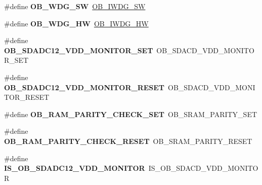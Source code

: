 \begin{DoxyCompactItemize}
\#define {\bfseries O\+B\+\_\+\+W\+D\+G\+\_\+\+SW}~\mbox{\hyperlink{group___f_l_a_s_h_ex___option___bytes___i_watchdog_ga5a357e232c955444c3f2ccb9a937ffce}{O\+B\+\_\+\+I\+W\+D\+G\+\_\+\+SW}}
\item 
\mbox{\label{group___h_a_l___f_l_a_s_h___aliased___defines_gae9a94b5f21aaa5dd5558095fa684b5a3}} 
\#define {\bfseries O\+B\+\_\+\+W\+D\+G\+\_\+\+HW}~\mbox{\hyperlink{group___f_l_a_s_h_ex___option___bytes___i_watchdog_gadfcbfa963d79c339ec8e2d5a7734e47a}{O\+B\+\_\+\+I\+W\+D\+G\+\_\+\+HW}}
\item 
\mbox{\label{group___h_a_l___f_l_a_s_h___aliased___defines_ga28d03f0c0e87570a3bc2faa4e720b8e3}} 
\#define {\bfseries O\+B\+\_\+\+S\+D\+A\+D\+C12\+\_\+\+V\+D\+D\+\_\+\+M\+O\+N\+I\+T\+O\+R\+\_\+\+S\+ET}~O\+B\+\_\+\+S\+D\+A\+C\+D\+\_\+\+V\+D\+D\+\_\+\+M\+O\+N\+I\+T\+O\+R\+\_\+\+S\+ET
\item 
\mbox{\label{group___h_a_l___f_l_a_s_h___aliased___defines_ga330d35b134c5a576318103b718559b11}} 
\#define {\bfseries O\+B\+\_\+\+S\+D\+A\+D\+C12\+\_\+\+V\+D\+D\+\_\+\+M\+O\+N\+I\+T\+O\+R\+\_\+\+R\+E\+S\+ET}~O\+B\+\_\+\+S\+D\+A\+C\+D\+\_\+\+V\+D\+D\+\_\+\+M\+O\+N\+I\+T\+O\+R\+\_\+\+R\+E\+S\+ET
\item 
\mbox{\label{group___h_a_l___f_l_a_s_h___aliased___defines_ga98952cd374b07146bb79583fd61ef6e6}} 
\#define {\bfseries O\+B\+\_\+\+R\+A\+M\+\_\+\+P\+A\+R\+I\+T\+Y\+\_\+\+C\+H\+E\+C\+K\+\_\+\+S\+ET}~O\+B\+\_\+\+S\+R\+A\+M\+\_\+\+P\+A\+R\+I\+T\+Y\+\_\+\+S\+ET
\item 
\mbox{\label{group___h_a_l___f_l_a_s_h___aliased___defines_gab425a7c5a822ef819107a93463361bd9}} 
\#define {\bfseries O\+B\+\_\+\+R\+A\+M\+\_\+\+P\+A\+R\+I\+T\+Y\+\_\+\+C\+H\+E\+C\+K\+\_\+\+R\+E\+S\+ET}~O\+B\+\_\+\+S\+R\+A\+M\+\_\+\+P\+A\+R\+I\+T\+Y\+\_\+\+R\+E\+S\+ET
\item 
\mbox{\label{group___h_a_l___f_l_a_s_h___aliased___defines_gafc1560626d243a2c9fbd72dbb65c8941}} 
\#define {\bfseries I\+S\+\_\+\+O\+B\+\_\+\+S\+D\+A\+D\+C12\+\_\+\+V\+D\+D\+\_\+\+M\+O\+N\+I\+T\+OR}~I\+S\+\_\+\+O\+B\+\_\+\+S\+D\+A\+C\+D\+\_\+\+V\+D\+D\+\_\+\+M\+O\+N\+I\+T\+OR

\end{DoxyCompactItemize}
